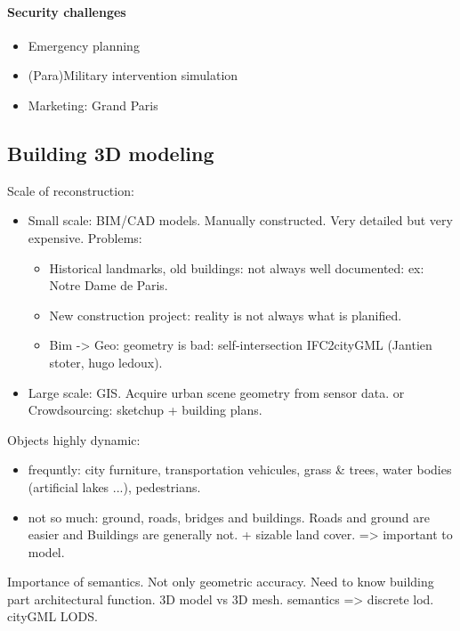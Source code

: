         \paragraph{Security challenges}
        \begin{itemize}
            \item Emergency planning
            \item (Para)Military intervention simulation
            \item Marketing: Grand Paris
        \end{itemize}
    \subsection{Building 3D modeling}
        \label{subsec::introduction::urban_3d_reconstruction::building_3d_modeling}
        Scale of reconstruction:
        \begin{itemize}
            \item Small scale: BIM/CAD models. Manually constructed. Very detailed but very expensive. Problems:
            \begin{itemize}
                \item Historical landmarks, old buildings: not always well documented: ex: Notre Dame de Paris.
                \item New construction project: reality is not always what is planified.
                \item Bim -> Geo: geometry is bad: self-intersection IFC2cityGML (Jantien stoter, hugo ledoux).
            \end{itemize}
            \item Large scale: GIS. Acquire urban scene geometry from sensor data. or Crowdsourcing: sketchup + building plans.
        \end{itemize}
        Objects highly dynamic:
        \begin{itemize}
            \item frequntly: city furniture, transportation vehicules, grass \& trees, water bodies (artificial lakes ...), pedestrians.
            \item not so much: ground, roads, bridges and buildings. Roads and ground are easier and Buildings are generally not. + sizable land cover. => important to model.\\
        \end{itemize}
        Importance of semantics. Not only geometric accuracy. Need to know building part architectural function. 3D model vs 3D mesh.
        semantics => discrete lod. cityGML LODS.\\
